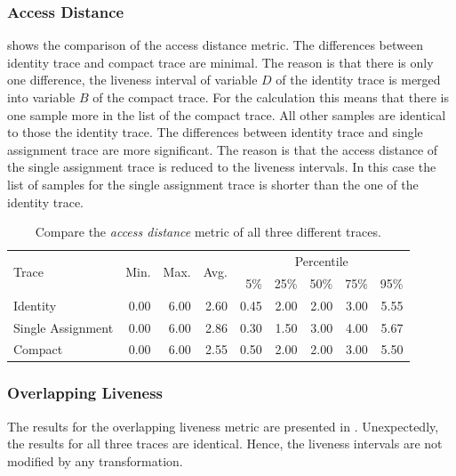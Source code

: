 \documentclass[onecolumn, openright, master, english, signatures]{dbrgrptt}
\begin{document}
\subsubsection{Access Distance}

 shows the comparison of the access distance metric.
The differences between identity \ac{trace} and compact \ac{trace} are minimal.
The reason is that there is only one difference, the liveness interval of variable $D$ of the identity \ac{trace} is merged into variable $B$ of the compact \ac{trace}.
For the calculation this means that there is one sample more in the list of the compact \ac{trace}.
All other samples are identical to those the identity \ac{trace}.
The differences between identity \ac{trace} and single assignment \ac{trace} are more significant.
The reason is that the access distance of the single assignment \ac{trace} is reduced to the liveness intervals.
In this case the list of samples for the single assignment \ac{trace} is shorter than the one of the identity \ac{trace}.

\begin{table}[!ht]
  \centering
  \begin{tabular}{lrrrrrrrr}
    \hline
    \multirow{2}{*}{Trace} & \multirow{2}{*}{Min.} & \multirow{2}{*}{Max.} & \multirow{2}{*}{Avg.} & \multicolumn{5}{c}{Percentile} \tabularnewline
    & & & & 5\% & 25\% & 50\% & 75\% & 95\% \tabularnewline
    \hline
    Identity          & 0.00 & 6.00 & 2.60 & 0.45 & 2.00 & 2.00 & 3.00 & 5.55 \\
    Single Assignment & 0.00 & 6.00 & 2.86 & 0.30 & 1.50 & 3.00 & 4.00 & 5.67 \\
    Compact           & 0.00 & 6.00 & 2.55 & 0.50 & 2.00 & 2.00 & 3.00 & 5.50 \\
    \hline
  \end{tabular}
  \caption{Compare the \emph{access distance} metric of all three different \ac{trace}s.}
  \label{tab:summarizing-example-metrics-overview-access-distance}
\end{table}

\subsubsection{Overlapping Liveness}
The results for the overlapping liveness metric are presented in .
Unexpectedly, the results for all three \ac{trace}s are identical.
Hence, the liveness intervals are not modified by any transformation.
\end{document}
